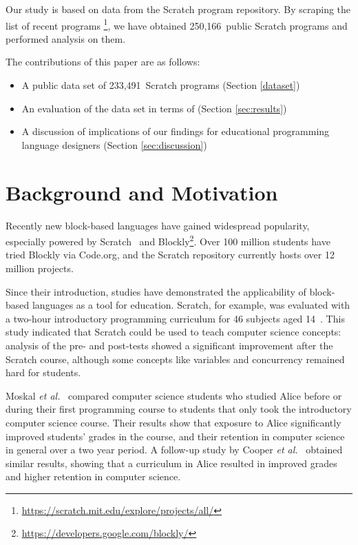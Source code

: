 \documentclass{sig-alternate}
\newcommand{\nPrograms}{250,166}
\newcommand{\nScriptPrograms}{233,491}
\begin{document}
Our study is based on data from the Scratch program repository. By scraping the list of recent programs \footnote{\url{https://scratch.mit.edu/explore/projects/all/}}, we have obtained \nPrograms~public Scratch programs and performed analysis on them.

The contributions of this paper are as follows:

\begin{itemize}
	\item{A public data set of \nScriptPrograms~Scratch programs (Section \ref{dataset})}
	\item{An evaluation of the data set in terms of (Section \ref{sec:results})}
	\item{A discussion of implications of our findings for educational programming language designers (Section \ref{sec:discussion})}
\end{itemize}


\section{Background and Motivation}
\label{sec:background}
Recently new block-based languages have gained widespread popularity, especially powered by Scratch~\cite{resnick_scratch:_2009} and Blockly\footnote{\url{https://developers.google.com/blockly/}}. Over 100 million students have tried Blockly via Code.org, and the Scratch repository currently hosts over 12 million projects. 

Since their introduction, studies have demonstrated the applicability of block-based languages as a tool for education. Scratch, for example, was evaluated with a two-hour introductory programming curriculum for 46 subjects aged 14~\cite{meerbaum-salant_learning_2010}. This study indicated that Scratch could be used to teach computer science concepts: analysis of the pre- and post-tests showed a significant improvement after the Scratch course, although some concepts like variables and concurrency remained hard for students.

Moskal \emph{et al.}~\cite{b._moskal_evaluating_2005} compared computer science students who studied Alice before or during their first programming course to students that only took the introductory computer science course. Their results show that exposure to Alice significantly improved students' grades in the course, and their retention in computer science in general over a two year period. A follow-up study by Cooper \emph{et al.}~\cite{cooper_teaching_2003} obtained similar results, showing that a curriculum in Alice resulted in improved grades and higher retention in computer science.
\end{document}
